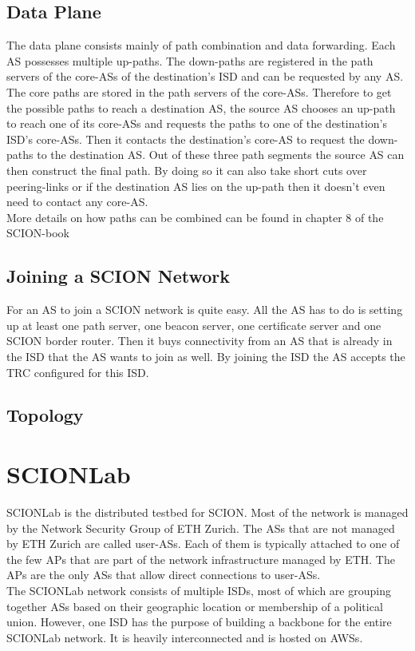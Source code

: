 \subsection{Data Plane}

The data plane consists mainly of path combination and data forwarding. Each \acs{AS} possesses multiple up-paths. The down-paths are registered in the path servers of the core-\acsp{AS} of the destination's \acs{ISD} and can be requested by any \acs{AS}. The core paths are stored in the path servers of the core-\acsp{AS}. Therefore to get the possible paths to reach a destination \acs{AS}, the source \acs{AS} chooses an up-path to reach one of its core-\acsp{AS} and requests the paths to one of the destination's \acs{ISD}'s core-\acsp{AS}. Then it contacts the destination's core-\acs{AS} to request the down-paths to the destination \acs{AS}. Out of these three path segments the source \acs{AS} can then construct the final path. By doing so it can also take short cuts over peering-links or if the destination \acs{AS} lies on the up-path then it doesn't even need to contact any core-\acs{AS}.
\\
More details on how paths can be combined can be found in chapter 8 of the \acs{SCION}-book \cite{perrig2017scion}

\subsection{Joining a SCION Network}
For an \acs{AS} to join a \acs{SCION} network is quite easy. All the \acs{AS} has to do is setting up at least one path server, one beacon server, one certificate server and one \acs{SCION} border router. Then it buys connectivity from an AS that is already in the \acs{ISD} that the \acs{AS} wants to join as well. By joining the \acs{ISD} the \acs{AS} accepts the \acs{TRC} configured for this \acs{ISD}.

\subsection{Topology}

\section{SCIONLab}
\acs{SCIONLab} is the distributed testbed for \acs{SCION}. Most of the network is managed by the Network Security Group of \acs{ETH} Zurich. The \acsp{AS} that are not managed by \acs{ETH} Zurich are called user-\acsp{AS}. Each of them is typically attached to one of the few \aclp{AP} that are part of the network infrastructure managed by \acs{ETH}. The \acsp{AP} are the only \acsp{AS} that allow direct connections to user-\acsp{AS}.
\\
The \acs{SCIONLab} network consists of multiple \acsp{ISD}, most of which are grouping together \acsp{AS} based on their geographic location or membership of a political union. However, one \acs{ISD} has the purpose of building a backbone for the entire \acs{SCIONLab} network. It is heavily interconnected and is hosted on \aclp{AWS}.

